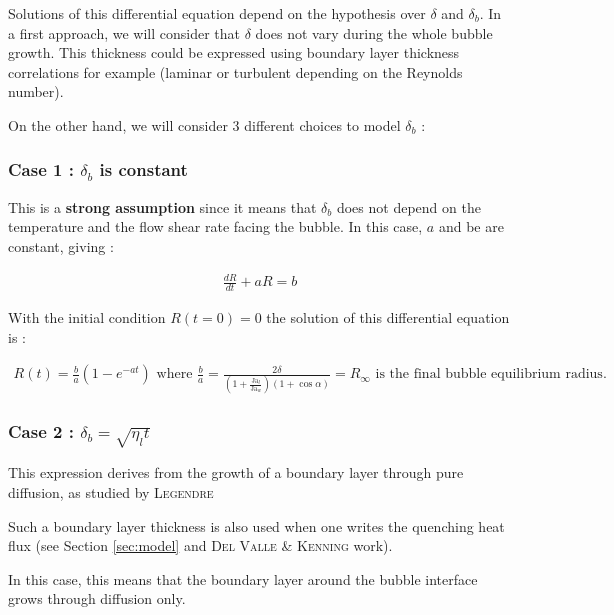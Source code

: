 \npar

Solutions of this differential equation depend on the hypothesis over $\delta$ and $\delta_{b}$. In a first approach, we will consider that $\delta$ does not vary during the whole bubble growth. This thickness could be expressed using boundary layer thickness correlations for example (laminar or turbulent depending on the Reynolds number). 

\npar

On the other hand, we will consider 3 different choices to model $\delta_{b}$ :


\npar
\subsubsection{Case 1 : $\delta_{b}$ is constant}


This is a \textbf{strong assumption} since it means that $\delta_{b}$ does not depend on the temperature and the flow shear rate facing the bubble. In this case, $a$ and be are constant, giving : 


\begin{align}
\frac{dR}{dt} + aR = b
\end{align}


With the initial condition $R(t=0)=0$ the solution of this differential equation is : 

\begin{align}
R\left(t\right)=\frac{b}{a}\left(1 - e^{-at}\right) \text{ where } \frac{b}{a} = \frac{2\delta}{\left(1 + \frac{\text{Ja}_{l}}{\text{Ja}_{w}}\right)\left(1 + \cos{\alpha} \right )}=R_{\infty} \text{ is the final bubble equilibrium radius.}
\end{align}


\subsubsection{Case 2 : $\delta_{b}=\sqrt{\eta_{l}t}$}
\npar

This expression derives from the growth of a boundary layer through pure diffusion, as studied by \textsc{Legendre} \etal

Such a boundary layer thickness is also used when one writes the quenching heat flux (see Section \ref{sec:model} and \textsc{Del Valle \& Kenning} work).

In this case, this means that the boundary layer around the bubble interface grows through diffusion only.

\npar

